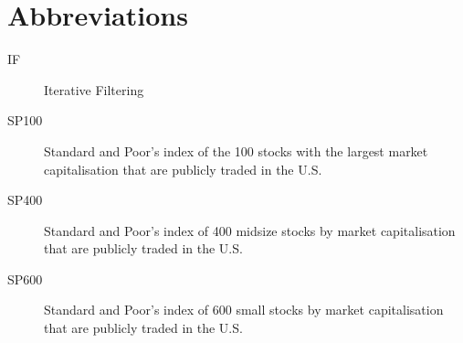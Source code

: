 \chapter*{Abbreviations}\label{abbr}
\begin{description}
\item[IF] Iterative Filtering
\item[SP100] Standard and Poor's index of the 100 stocks with the largest market capitalisation that are publicly traded in the U.S.
\item[SP400] Standard and Poor's index of 400 midsize stocks by market capitalisation that are publicly traded in the U.S.
\item[SP600] Standard and Poor's index of 600 small stocks by market capitalisation that are publicly traded in the U.S.

\end{description}
